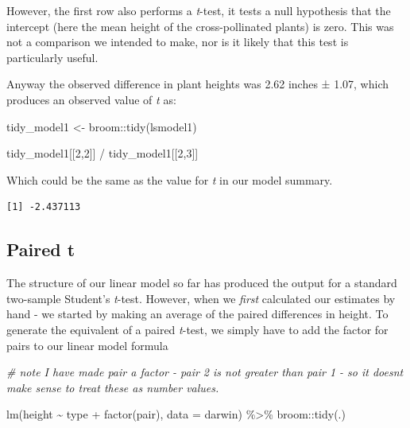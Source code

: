 \documentclass[
]{book}
\newenvironment{Shaded}{\begin{snugshade}}{\end{snugshade}}
\newcommand{\AttributeTok}[1]{\textcolor[rgb]{0.77,0.63,0.00}{#1}}
\newcommand{\CommentTok}[1]{\textcolor[rgb]{0.56,0.35,0.01}{\textit{#1}}}
\newcommand{\DecValTok}[1]{\textcolor[rgb]{0.00,0.00,0.81}{#1}}
\newcommand{\FunctionTok}[1]{\textcolor[rgb]{0.00,0.00,0.00}{#1}}
\newcommand{\NormalTok}[1]{#1}
\newcommand{\OtherTok}[1]{\textcolor[rgb]{0.56,0.35,0.01}{#1}}
\newcommand{\SpecialCharTok}[1]{\textcolor[rgb]{0.00,0.00,0.00}{#1}}
\begin{document}
However, the first row also performs a \emph{t}-test, it tests a null hypothesis that the intercept (here the mean height of the cross-pollinated plants) is zero. This was not a comparison we intended to make, nor is it likely that this test is particularly useful.

Anyway the observed difference in plant heights was 2.62 inches ± 1.07, which produces an observed value of \emph{t} as:

\begin{Shaded}
\begin{Highlighting}[]
\NormalTok{tidy\_model1 }\OtherTok{\textless{}{-}}\NormalTok{ broom}\SpecialCharTok{::}\FunctionTok{tidy}\NormalTok{(lsmodel1)}

\NormalTok{tidy\_model1[[}\DecValTok{2}\NormalTok{,}\DecValTok{2}\NormalTok{]] }\SpecialCharTok{/}\NormalTok{ tidy\_model1[[}\DecValTok{2}\NormalTok{,}\DecValTok{3}\NormalTok{]]}
\end{Highlighting}
\end{Shaded}

Which could be the same as the value for \emph{t} in our model summary.

\begin{verbatim}
[1] -2.437113
\end{verbatim}

\hypertarget{paired-t}{%
\subsection{Paired t}\label{paired-t}}

The structure of our linear model so far has produced the output for a standard two-sample Student's \emph{t}-test. However, when we \emph{first} calculated our estimates by hand - we started by making an average of the paired differences in height. To generate the equivalent of a paired \emph{t}-test, we simply have to add the factor for pairs to our linear model formula

\begin{Shaded}
\begin{Highlighting}[]
\CommentTok{\# note I have made pair a factor {-} pair 2 is not greater than pair 1 {-} so it doesn\textquotesingle{}t make sense to treat these as number values.}

\FunctionTok{lm}\NormalTok{(height }\SpecialCharTok{\textasciitilde{}}\NormalTok{ type }\SpecialCharTok{+} \FunctionTok{factor}\NormalTok{(pair), }\AttributeTok{data =}\NormalTok{ darwin) }\SpecialCharTok{\%\textgreater{}\%} 
\NormalTok{  broom}\SpecialCharTok{::}\FunctionTok{tidy}\NormalTok{(.)}
\end{Highlighting}
\end{Shaded}
\end{document}

